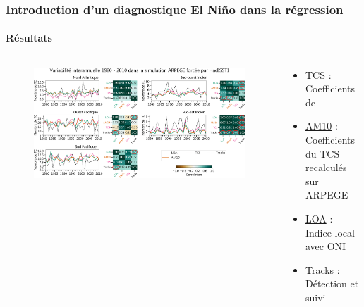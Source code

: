 \documentclass[aspectratio=169, usepdftitle=false, xcolor={dvipsnames}, 9pt,table]{beamer}
\begin{document}
\begin{frame}[t]
    \frametitle{Introduction d'un diagnostique El Niño dans la régression}
    \framesubtitle{Résultats}
    \vspace{-1em}
    \begin{columns}
        \begin{column}{0.8\textwidth}
            \begin{figure}
                \centering
                \includegraphics[width=\textwidth]{Figures/apport_ONI.png}
            \end{figure}
        \end{column}
        \begin{column}{0.2\textwidth}
            \scriptsize
            \begin{examples}
                \setlength{\leftmargini}{2.5ex}
                \begin{itemize}
                    \item \underline{TCS} :\\Coefficients de \cite{tippett_poisson_2011}
                    \item \underline{AM10} :\\Coefficients du TCS recalculés sur ARPEGE
                    \item \underline{LOA} :\\Indice \alert{local} avec ONI
                    \item \underline{Tracks} :\\Détection et suivi
                \end{itemize}
            \end{examples}
            \begin{block}
                \setlength{\leftmargini}{2.5ex}

\end{block}
\end{column}
\end{columns}
\end{frame}
\end{document}
